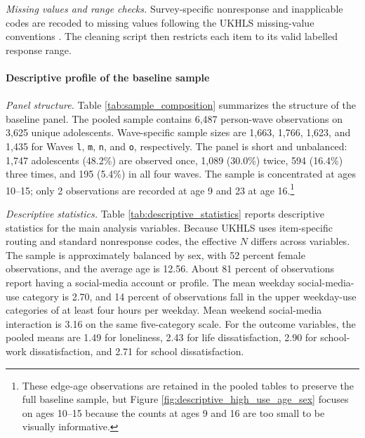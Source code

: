 \documentclass[11pt,oneside,a4paper]{book}
\begin{document}
\textit{Missing values and range checks.} Survey-specific nonresponse and inapplicable codes are recoded to missing values following the UKHLS missing-value conventions \citep{iser2025userguide}. The cleaning script then restricts each item to its valid labelled response range. \\
\\
\textbf{Descriptive profile of the baseline sample}\\
\\
\textit{Panel structure.} Table \ref{tab:sample_composition} summarizes the structure of the baseline panel. The pooled sample contains 6,487 person-wave observations on 3,625 unique adolescents. Wave-specific sample sizes are 1,663, 1,766, 1,623, and 1,435 for Waves \texttt{l}, \texttt{m}, \texttt{n}, and \texttt{o}, respectively. The panel is short and unbalanced: 1,747 adolescents (48.2\%) are observed once, 1,089 (30.0\%) twice, 594 (16.4\%) three times, and 195 (5.4\%) in all four waves. The sample is concentrated at ages 10--15; only 2 observations are recorded at age 9 and 23 at age 16.\footnote{These edge-age observations are retained in the pooled tables to preserve the full baseline sample, but Figure \ref{fig:descriptive_high_use_age_sex} focuses on ages 10--15 because the counts at ages 9 and 16 are too small to be visually informative.}



\textit{Descriptive statistics.} Table \ref{tab:descriptive_statistics} reports descriptive statistics for the main analysis variables. Because UKHLS uses item-specific routing and standard nonresponse codes, the effective \(N\) differs across variables. The sample is approximately balanced by sex, with 52 percent female observations, and the average age is 12.56. About 81 percent of observations report having a social-media account or profile. The mean weekday social-media-use category is 2.70, and 14 percent of observations fall in the upper weekday-use categories of at least four hours per weekday. Mean weekend social-media interaction is 3.16 on the same five-category scale. For the outcome variables, the pooled means are 1.49 for loneliness, 2.43 for life dissatisfaction, 2.90 for school-work dissatisfaction, and 2.71 for school dissatisfaction.


\end{document}
